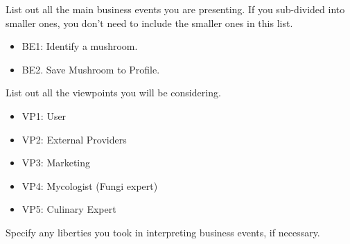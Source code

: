 \documentclass[]{article}
\begin{document}
 List out all the main business events you are presenting. If you sub-divided into smaller ones, you don't need to include the smaller ones in this list.\\

\begin{itemize}
	\item BE1: Identify a mushroom.
 	\item BE2. Save Mushroom to Profile.
\end{itemize}

 List out all the viewpoints you will be considering.\\

\begin{itemize}
	\item VP1: User
	\item VP2: External Providers
	\item VP3: Marketing
	\item VP4: Mycologist (Fungi expert)
	\item VP5: Culinary Expert
\end{itemize}

 Specify any liberties you took in interpreting business events, if necessary.\\
\end{document}
